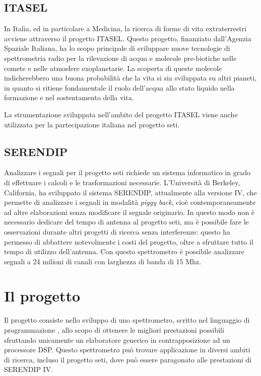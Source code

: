 \subsection*{\ac{ITASEL}}
In Italia, ed in particolare a Medicina, la ricerca di forme di vita
extraterrestri avviene attraverso il progetto \ac{ITASEL}. Questo progetto,
finanziato dall'Agenzia Spaziale Italiana, ha lo scopo principale di sviluppare
nuove tecnologie di spettrometria radio per la rilevazione di acqua e molecole
pre-biotiche nelle comete e nelle atmosfere exoplanetarie. La scoperta di queste
molecole indicherebbero una buona probabilit\`a che la vita si sia sviluppata su
altri pianeti, in quanto si ritiene fondamentale il ruolo dell'acqua allo stato
liquido nella formazione e nel sostentamento della vita.

La strumentazione sviluppata nell'ambito del progetto \ac{ITASEL} viene anche
utilizzata per la partecipazione italiana nel progetto \ac{seti}.

\subsection*{\ac{SERENDIP}}
Analizzare i segnali per il progetto \ac{seti} richiede un sistema informatico
in grado di effettuare i calcoli e le trasformazioni necessarie. L'Universit\`a
di Berkeley, California, ha sviluppato il sistema \ac{SERENDIP}, attualmente
alla versione IV, che permette di analizzare i segnali in modalit\`a \emph{piggy
back}, cio\`e contemporaneamente ad altre elaborazioni senza modificare il
segnale originario. In questo modo non \`e necessario dedicare del tempo di
antenna al progetto \ac{seti}, ma \`e possibile fare le osservazioni durante
altri progetti di ricerca senza interferenze: questo ha permesso di abbattere
notevolmente i costi del progetto, oltre a sfruttare tutto il tempo di utilizzo
dell'antenna. Con questo spettrometro \`e possibile analizzare segnali a 24
milioni di canali con larghezza di banda di 15 Mhz.

\section*{Il progetto}
Il progetto consiste nello sviluppo di uno spettrometro, scritto nel linguaggio
di programmazione \CC, allo scopo di ottenere le migliori prestazioni possibili
sfruttando unicamente un elaboratore generico in contrapposizione ad un
processore DSP. Questo spettrometro pu\`o trovare applicazione in diversi ambiti
di ricerca, incluso il progetto \ac{seti}, dove pu\`o essere paragonato alle
prestazioni di \ac{SERENDIP} IV.

